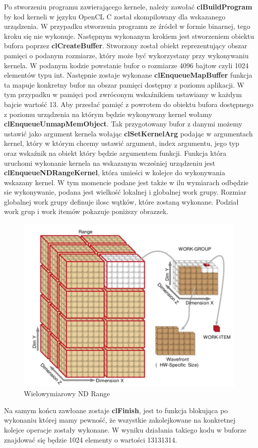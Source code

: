 Po stworzeniu programu zawierającego kernele, należy zawołać \textbf{clBuildProgram} by kod kerneli w języku OpenCL C został skompilowany dla wskazanego urządzenia. W przypadku stworzenia programu ze źródeł w formie binarnej, tego kroku się nie wykonuje.
Następnym wykonanym krokiem jest stworzeniem obiektu bufora poprzez \textbf{clCreateBuffer}. Stworzony został obiekt reprezentujący obszar pamięci o podanym rozmiarze, który może być wykorzystany przy wykonywaniu kernela. W podanym kodzie powstanie bufor o rozmiarze 4096 bajtow czyli 1024 elementów typu int.
Następnie zostaje wykonane \textbf{clEnqueueMapBuffer} funkcja ta mapuje konkretny bufor na obszar pamięci dostępny z poziomu aplikacji. W tym przypadku w pamięci pod zwróconym wskaźnikiem ustawiamy w każdym bajcie wartość 13.
Aby przesłać pamięć z powrotem do obiektu bufora dostępnego z poziomu urządzenia na którym będzie wykonywany kernel wołamy \textbf{clEnqueueUnmapMemObject}.
Tak przygotowany bufor z danymi możemy ustawić jako argument kernela wołając \textbf{clSetKernelArg} podając w argumentach kernel, który w którym chcemy ustawić argument, index argumentu, jego typ oraz wskaźnik na obiekt który będzie argumentem funkcji.
Funkcja która uruchomi wykonanie kernela na wskazanym wcześniej urządzeniu jest \textbf{clEnqueueNDRangeKernel}, która umieści w kolejce do wykonywania wskazany kernel. W tym momencie podane jest także w ilu wymiarach odbędzie sie wykonywanie, podana jest wielkość lokalnej i globalnej work grupy. Rozmiar globalnej work grupy definuje ilosc wątków, które zostaną wykonane. Podział work grup i work itemów pokazuje poniższy obrazzek.
\begin{figure}[H]
	\includegraphics[scale=0.4]{imgs/WorkDims.jpg}
	\caption{Wielowymiarowy ND Range}
\end{figure}
Na samym końcu zawłoane zostaje \textbf{clFinish}, jest to funkcja blokująca po wykonaniu której mamy pewność, że wszystkie zakolejkowane na konkretnej kolejce operacje zostały wykonane.
W wyniku działania takiego kodu w buforze znajdować się będzie 1024 elementy o wartości 13131314.
